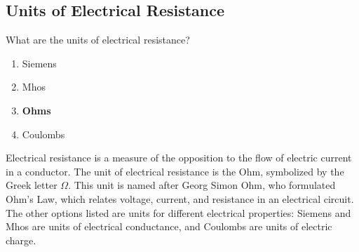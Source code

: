 \subsection{Units of Electrical Resistance}
\label{T5A04}

\begin{tcolorbox}[colback=gray!10!white,colframe=black!75!black,title=T5A04]
What are the units of electrical resistance?
\begin{enumerate}[noitemsep]
    \item Siemens
    \item Mhos
    \item \textbf{Ohms}
    \item Coulombs
\end{enumerate}
\end{tcolorbox}

Electrical resistance is a measure of the opposition to the flow of electric current in a conductor. The unit of electrical resistance is the Ohm, symbolized by the Greek letter $\Omega$. This unit is named after Georg Simon Ohm, who formulated Ohm's Law, which relates voltage, current, and resistance in an electrical circuit. The other options listed are units for different electrical properties: Siemens and Mhos are units of electrical conductance, and Coulombs are units of electric charge.